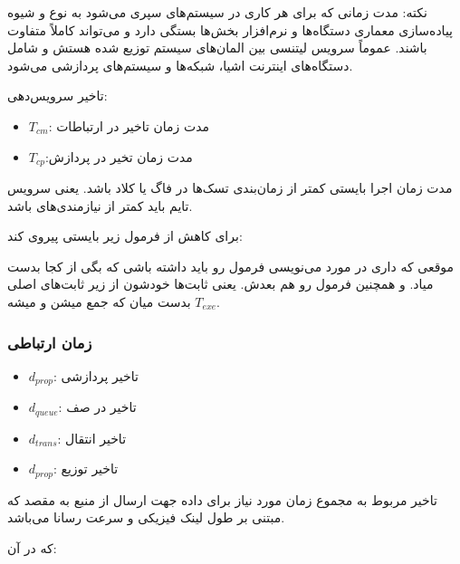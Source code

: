\documentclass[a4paper]{article}
\begin{document}
نکته: مدت زمانی که برای هر کاری در سیستم‌های  سپری می‌شود به نوع و شیوه
پیاده‌سازی معماری دستگاه‌ها و نرم‌افزار بخش‌ها بستگی دارد و می‌تواند کاملاً
متفاوت باشند. عموماً سرویس لیتنسی بین المان‌های سیستم  توزیع شده هستش و
شامل دستگاه‌های اینترنت اشیا، شبکه‌ها و سیستم‌های پردازشی می‌شود.

تاخیر سرویس‌دهی:


\begin{itemize}
    \item $T_{cm}$: مدت زمان تاخیر در ارتباطات
    \item $T_{cp}$:مدت زمان تخیر در پردازش
\end{itemize}

مدت زمان اجرا بایستی کمتر از زمان‌بندی تسک‌ها در فاگ یا کلاد باشد. یعنی سرویس
تایم باید کمتر از نیازمندی‌های  باشد.

برای کاهش  از فرمول زیر بایستی پیروی کند:


موقعی که داری در مورد  می‌نویسی فرمول  رو باید داشته باشی که بگی از کجا بدست میاد. و همچنین فرمول
 رو هم بعدش. یعنی ثابت‌ها خودشون از زیر ثابت‌های اصلی
بدست میان که جمع میشن و میشه $T_{exe}$.

\subsubsection{زمان ارتباطی}


\begin{itemize}
    \item $d_{prop}$: تاخیر پردازشی
    \item $d_{queue}$: تاخیر در صف
    \item $d_{trans}$: تاخیر انتقال
    \item $d_{prop}$: تاخیر توزیع
\end{itemize}

تاخیر مربوط به  مجموع زمان مورد نیاز برای داده جهت ارسال از منبع
به مقصد که مبتنی بر طول لینک فیزیکی و سرعت رسانا می‌باشد.


که در آن:
\end{document}
